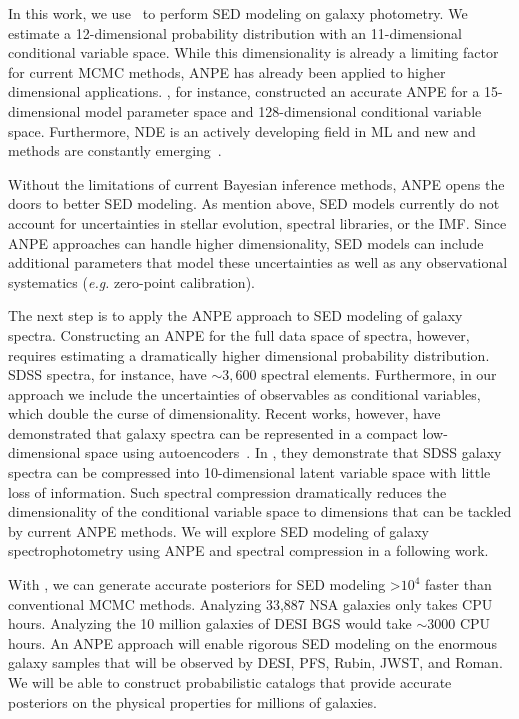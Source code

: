In this work, we use \sedflow~to perform SED modeling on galaxy photometry. 
We estimate a 12-dimensional probability distribution with an 11-dimensional
conditional variable space. 
While this dimensionality is already a limiting factor for current MCMC
methods, ANPE has already been applied to higher dimensional applications.
\cite{dax2021}, for instance, constructed an accurate ANPE for a
15-dimensional model parameter space and 128-dimensional conditional variable
space.
Furthermore, NDE is an actively developing field in ML and new and methods are
constantly emerging~\citep[\eg][]{wu2020, dhariwal2021}. 

Without the limitations of current Bayesian inference methods, ANPE opens the
doors to better SED modeling. 
As mention above, SED models currently do not account for uncertainties in
stellar evolution, spectral libraries, or the IMF. 
Since ANPE approaches can handle higher dimensionality, SED models can include 
additional parameters that model these uncertainties as well as any
observational systematics (\emph{e.g.} zero-point calibration). 

The next step is to apply the ANPE approach to SED modeling of galaxy spectra. 
Constructing an ANPE for the full data space of spectra, however, requires
estimating a dramatically higher dimensional probability distribution. 
SDSS spectra, for instance, have ${\sim}3,600$ spectral elements.  
Furthermore, in our approach we include the uncertainties of observables as
conditional variables, which double the curse of dimensionality.
Recent works, however, have demonstrated that galaxy spectra can be represented
in a compact low-dimensional space using autoencoders~\citep[][; Melchior \&
Hahn in prep.]{portillo2020}.
In \cite{portillo2020}, they demonstrate that SDSS galaxy spectra can be
compressed into 10-dimensional latent variable space with little loss of
information. 
Such spectral compression dramatically reduces the dimensionality of the
conditional variable space to dimensions that can be tackled by current ANPE
methods. 
We will explore SED modeling of galaxy spectrophotometry using ANPE and
spectral compression in a following work. 

With \sedflow, we can generate accurate posteriors for SED modeling >$10^4$
faster than conventional MCMC methods. 
Analyzing 33,887 NSA galaxies only takes  CPU hours.
Analyzing the 10 million galaxies of DESI BGS would take ${\sim}3000$ CPU hours.
An ANPE approach will enable rigorous SED modeling on the enormous galaxy
samples that will be observed by DESI, PFS, Rubin, JWST, and Roman. 
We will be able to construct probabilistic catalogs that provide accurate
posteriors on the physical properties for millions of galaxies. 

